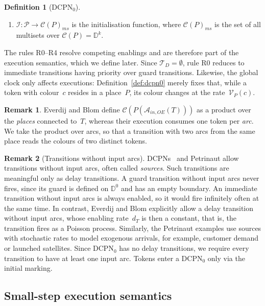 \documentclass[11pt]{article}
\theoremstyle{definition}
\newcommand{\Dom}{\mathbb{D}}
\newcommand{\DCPN}[1]{\texorpdfstring{\textup{DCPN}\ensuremath{_{#1}}}{DCPN#1}}
\newtheorem{definition}{Definition}
\newtheorem{remark}{Remark}
\begin{document}
\begin{definition}[\DCPN{0}]
\begin{enumerate}
    \item $\mathcal{I} : \mathcal{P} \to \mathcal{C}(P)_{\mathit{ms}}$ is the
      initialisation function, where $\mathcal{C}(P)_{\mathit{ms}}$ is the set
      of all multisets over $\mathcal{C}(P) = \Dom^k$.
  \end{enumerate}
\end{definition}

The rules R0--R4 resolve competing enablings and are therefore part of the
execution semantics, which we define later. Since $\mathcal{T}_D = \emptyset$,
rule R0 reduces to immediate transitions having priority over guard
transitions. Likewise, the global clock only affects executions:
Definition~\ref{def:dcpn0} merely fixes that, while a token with colour~$c$
resides in a place~$P$, its colour changes at the rate~$\mathcal{V}_P(c)$.

\begin{remark}
  Everdij and Blom define $\mathcal{C}(P(\mathcal{A}_{\mathit{in},OE}(T)))$
  as a product over the \emph{places} connected to~$T$, whereas their
  execution consumes one token per \emph{arc}. We take the product over arcs,
  so that a transition with two arcs from the same place reads the colours of
  two distinct tokens.
\end{remark}

\begin{remark}[Transitions without input arcs]\label{rem:sources}
  DCPNs~\cite{EverdijBlom2005} and Petrinaut allow transitions without input
  arcs, often called \emph{sources}. Such transitions are meaningful only as
  delay transitions. A guard transition without input arcs never fires, since
  its guard is defined on $\Dom^0$ and has an empty boundary. An immediate
  transition without input arcs is always enabled, so it would fire infinitely
  often at the same time. In contrast, Everdij and Blom explicitly allow a
  delay transition without input arcs, whose enabling rate~$d_T$ is then a
  constant, that is, the transition fires as a Poisson process. Similarly, the
  Petrinaut examples use sources with stochastic rates to model exogenous
  arrivals, for example, customer demand or launched satellites. Since
  \DCPN{0} has no delay transitions, we require every transition to have at
  least one input arc. Tokens enter a \DCPN{0} only via the initial marking.
\end{remark}

\subsection{Small-step execution semantics}
\end{document}
